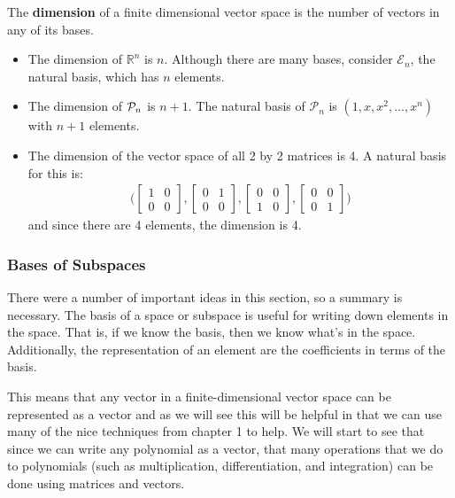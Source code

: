 \begin{definition}
The \textbf{dimension} of a finite dimensional vector space is the number of vectors in any of its bases.  
\end{definition}


\begin{example}
\begin{itemize}
\item The dimension of $\mathbb{R}^n$ is $n$.  Although there are many bases, consider $\mathcal{E}_n$, the natural basis, which has $n$ elements. 


\item The dimension of ${\cal P}_n$ is $n+1$.  The natural basis of $\mathcal{P}_n$ is $(1,x,x^2, \ldots, x^n)$ with $n+1$ elements.  

\item The dimension of the vector space of all 2 by 2 matrices is 4.  A natural basis for this is:
\begin{align*}
\biggl( \begin{bmatrix}
1 & 0 \\ 0 & 0 
\end{bmatrix}, \begin{bmatrix}
0 & 1 \\ 0 & 0 
\end{bmatrix}, \begin{bmatrix}
0 & 0 \\ 1 & 0 
\end{bmatrix}, \begin{bmatrix}
0 & 0 \\ 0 & 1
\end{bmatrix} \biggr)
\end{align*}
and since there are 4 elements, the dimension is 4. 
\end{itemize}
\end{example}

\subsubsection{Bases of Subspaces}

There were a number of important ideas in this section, so a summary is necessary.  The basis of a space or subspace is useful for writing down elements in the space.  That is, if we know the basis, then we know what's in the space.  Additionally, the representation of an element are the coefficients in terms of the basis. 

This means that any vector in a finite-dimensional vector space can be represented as a vector and as we will see this will be helpful in that we can use many of the nice techniques from chapter 1 to help.  We will start to see that since we can write any polynomial as a vector, that many operations that we do to polynomials (such as  multiplication, differentiation, and integration) can be done using matrices and vectors. 




